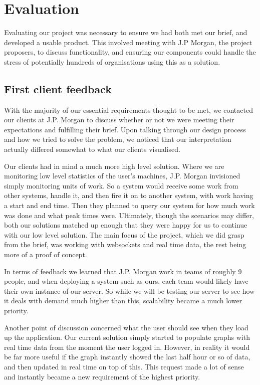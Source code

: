\documentclass{l3proj}
\begin{document}
\chapter{Evaluation}

Evaluating our project was necessary to ensure we had both met our brief, and developed a usable product. This involved meeting with J.P Morgan, the project proposers, to discuss functionality, and ensuring our components could handle the stress of potentially hundreds of organisations using this as a solution.


\section{First client feedback}

With the majority of our essential requirements thought to be met, we contacted our clients at J.P. Morgan to discuss whether or not we were meeting their expectations and fulfilling their brief. Upon talking through our design process and how we tried to solve the problem, we noticed that our interpretation actually differed somewhat to what our clients visualised.

Our clients had in mind a much more high level solution. Where we are monitoring low level statistics of the user's machines, J.P. Morgan invisioned simply monitoring units of work. So a system would receive some work from other systems, handle it, and then fire it on to another system, with work having a start and end time. Then they planned to query our system for how much work was done and what peak times were. Ultimately, though the scenarios may differ, both our solutions matched up enough that they were happy for us to continue with our low level solution. The main focus of the project, which we did grasp from the brief, was working with websockets and real time data, the rest being more of a proof of concept.

In terms of feedback we learned that J.P. Morgan work in teams of roughly 9 people, and when deploying a system such as ours, each team would likely have their own instance of our server. So while we will be testing our server to see how it deals with demand much higher than this, scalability became a much lower priority.

Another point of discussion concerned what the user should see when they load up the application. Our current solution simply started to populate graphs with real time data from the moment the user logged in. However, in reality it would be far more useful if the graph instantly showed the last half hour or so of data, and then updated in real time on top of this. This request made a lot of sense and instantly became a new requirement of the highest priority.
\end{document}
